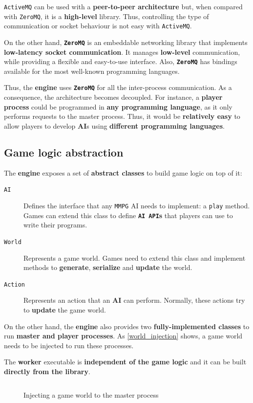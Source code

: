 \documentclass[a4paper,11pt,titlepage,abstract,numbers=noenddot,automark,mnsy,intlimits,rgb,dvipsnames]{report}
\begin{document}
\texttt{ActiveMQ} can be used with a \textbf{peer-to-peer architecture} but, when compared with \texttt{ZeroMQ}, it is a
\textbf{high-level} library. Thus, controlling the type of communication or socket behaviour is not easy with \texttt{ActiveMQ}.

On the other hand, \textbf{\texttt{ZeroMQ}} \cite{zeromq} is an embeddable networking library that implements \textbf{low-latency socket communication}. It manages
\textbf{low-level} communication, while providing a flexible and easy-to-use interface. Also, \textbf{\texttt{ZeroMQ}} has bindings available
for the most well-known programming languages.

Thus, the \textbf{engine} uses \textbf{\texttt{ZeroMQ}} for all the inter-process communication. As a consequence, the architecture becomes
decoupled. For instance, a \textbf{player process} could be programmed in \textbf{any programming language}, as it
only performs requests to the master process. Thus, it would be \textbf{relatively easy} to allow players to develop
\textbf{AI}s using \textbf{different programming languages}.
\subsection{Game logic abstraction}
\indent
The \textbf{engine} exposes a set of \textbf{abstract classes} to build game logic on top of it:
\begin{description}
\item[\texttt{AI}]
Defines the interface that any \texttt{MMPG} AI needs to implement: a \texttt{play} method. Games can extend
  this class to define \textbf{\texttt{AI API}s} that players can use to write their programs.
\item[\texttt{World}]
Represents a game world. Games need to extend this class and implement methods to
  \textbf{generate}, \textbf{serialize} and \textbf{update} the world.
\item[\texttt{Action}]
Represents an action that an \textbf{AI} can perform. Normally, these actions try to \textbf{update}
  the game world.
\end{description}
On the other hand, the \textbf{engine} also provides two \textbf{fully-implemented classes} to run \textbf{master and player
processes}. As \autoref{world_injection} shows, a game world needs to be injected to run these processes.

The \textbf{worker} executable is \textbf{independent of the game logic} and it can be built \textbf{directly from the library}.
\begin{figure}[H]
\inputminted[linenos,fontsize=\small,frame=lines,framesep=2mm]{c++}{code/master.cpp}
\caption{Injecting a game world to the master process}
\label{world_injection}
\end{figure}
\clearpage
\end{document}
